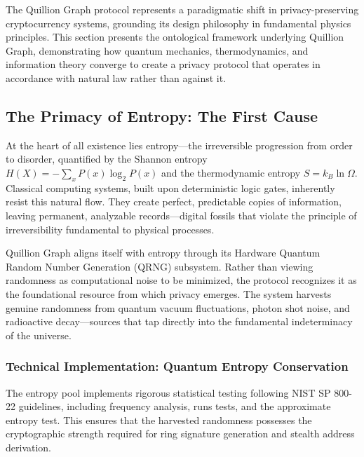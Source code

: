 \documentclass[12pt,a4paper]{article}
\begin{document}
The Quillion Graph protocol represents a paradigmatic shift in privacy-preserving cryptocurrency systems, grounding its design philosophy in fundamental physics principles. This section presents the ontological framework underlying Quillion Graph, demonstrating how quantum mechanics, thermodynamics, and information theory converge to create a privacy protocol that operates in accordance with natural law rather than against it.

\subsection{The Primacy of Entropy: The First Cause}

At the heart of all existence lies entropy—the irreversible progression from order to disorder, quantified by the Shannon entropy $H(X) = -\sum_{x} P(x) \log_2 P(x)$ and the thermodynamic entropy $S = k_B \ln \Omega$. Classical computing systems, built upon deterministic logic gates, inherently resist this natural flow. They create perfect, predictable copies of information, leaving permanent, analyzable records—digital fossils that violate the principle of irreversibility fundamental to physical processes.

Quillion Graph aligns itself with entropy through its Hardware Quantum Random Number Generation (QRNG) subsystem. Rather than viewing randomness as computational noise to be minimized, the protocol recognizes it as the foundational resource from which privacy emerges. The system harvests genuine randomness from quantum vacuum fluctuations, photon shot noise, and radioactive decay—sources that tap directly into the fundamental indeterminacy of the universe.

\subsubsection{Technical Implementation: Quantum Entropy Conservation}

The entropy pool implements rigorous statistical testing following NIST SP 800-22 guidelines, including frequency analysis, runs tests, and the approximate entropy test. This ensures that the harvested randomness possesses the cryptographic strength required for ring signature generation and stealth address derivation.
\end{document}
